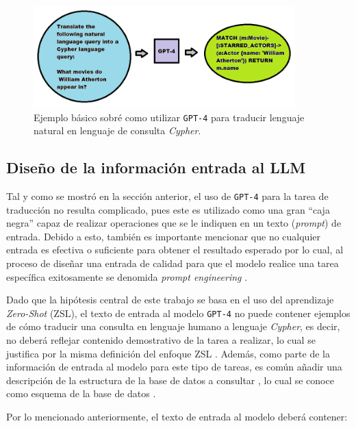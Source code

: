 \begin{figure}[H]\label{simplegpt4}
	\centering
	\includegraphics[width = 0.9\textwidth]{./Graphics/simplegpt4use}
	\caption{Ejemplo básico sobré como utilizar \texttt{GPT-4} para traducir lenguaje natural en lenguaje de consulta \textit{Cypher}.}
\end{figure}

\subsection{Diseño de la información entrada al LLM} \label{prompt_design}

Tal y como se mostró en la sección anterior, el uso de \texttt{GPT-4} para la tarea de traducción no resulta complicado, pues este es utilizado como una gran ``caja negra'' capaz de realizar operaciones que se le indiquen en un texto (\textit{prompt}) de entrada. Debido a esto, también es importante mencionar que no cualquier entrada es efectiva o suficiente para obtener el resultado esperado por lo cual, al proceso de diseñar una entrada de calidad para que el modelo realice una tarea específica exitosamente se denomida \textit{prompt engineering} \cite{promptengineering}. 

Dado que la hipótesis central de este trabajo se basa en el uso del aprendizaje \textit{Zero-Shot} (ZSL), el texto de entrada al modelo \texttt{GPT-4} no puede contener ejemplos de cómo traducir una consulta en lenguaje humano a lenguaje \textit{Cypher}, es decir, no deberá reflejar contenido demostrativo de la tarea a realizar, lo cual se justifica por la misma definición del enfoque ZSL \cite{zeroshotlearning}. Además, como parte de la información de entrada al modelo para este tipo de tareas, es común añadir una descripción de la estructura de la base de datos a consultar \cite{text2sql1}, lo cual se conoce como esquema de la base de datos \cite{dbschema}. 

Por lo mencionado anteriormente, el texto de entrada al modelo deberá contener:

